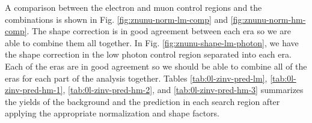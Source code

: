 A comparison between the electron and muon control regions and the combinations is shown in Fig. \ref{fig:znunu-norm-lm-comp} and \ref{fig:znunu-norm-hm-comp}. The shape correction is in good agreement between each era so we are able to combine them all together. In Fig. \ref{fig:znunu-shape-lm-photon}, we have the shape correction in the low \dm{} photon control region separated into each era. Each of the eras are in good agreement so we should be able to combine all of the eras for each part of the analysis together. Tables \ref{tab:0l-zinv-pred-lm}, \ref{tab:0l-zinv-pred-hm-1}, \ref{tab:0l-zinv-pred-hm-2}, and \ref{tab:0l-zinv-pred-hm-3} summarizes the yields of the \Znunu{} background and the prediction in each search region after applying the appropriate normalization and shape factors.  






